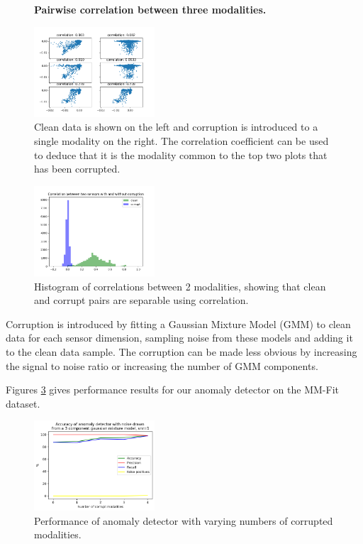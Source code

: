 \begin{figure}[H]
    \centering
    \textbf{Pairwise correlation between three modalities.}\par\medskip
    \includegraphics[width=0.4\textwidth]{images/plots.png}
    \caption{Clean data is shown on the left and corruption is introduced to a single modality on the right. The correlation coefficient can be used to deduce that it is the modality common to the top two plots that has been corrupted.}
    \label{fig:corr_plots}
\end{figure}

\begin{figure}[H]
    \centering
    \includegraphics[width=0.4\textwidth]{images/histograms.png}
    \caption{Histogram of correlations between 2 modalities, showing that clean and corrupt pairs are separable using correlation.}
    \label{fig:corr_hist}
\end{figure}

Corruption is introduced by fitting a Gaussian Mixture Model (GMM) to clean data for each sensor dimension, sampling noise from these models and adding it to the clean data sample. The corruption can be made less obvious by increasing the signal to noise ratio or increasing the number of GMM components.

Figures \ref{fig:corr_perf} gives performance results for our anomaly detector on the MM-Fit dataset.

\begin{figure}[H]
    \centering
    \includegraphics[width=0.4\textwidth]{images/corr_perf.png}
    \caption{Performance of anomaly detector with varying numbers of corrupted modalities.}
    \label{fig:corr_perf}
\end{figure}

